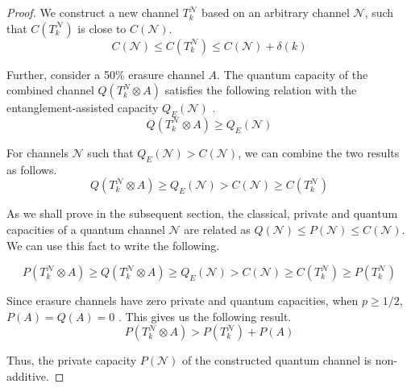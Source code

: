 \begin{proof}
We construct a new channel $T_k^\mathcal{N}$ based on an arbitrary channel $\mathcal{N}$, such that $C(T_k^\mathcal{N})$ is close to $C(\mathcal{N})$.
$$C(\mathcal{N}) \leq C(T_k^\mathcal{N}) \leq C(\mathcal{N}) + \delta(k)$$

Further, consider a 50\% erasure channel $A$. The quantum capacity of the combined channel $Q(T_k^N \otimes A)$ satisfies the following relation with the entanglement-assisted capacity $Q_E(\mathcal{N})$ \cite{PhysRevLett.83.3081}.
$$Q(T_k^\mathcal{N} \otimes A) \geq Q_E(\mathcal{N})$$

For channels $\mathcal{N}$ such that $Q_E(\mathcal{N}) > C(\mathcal{N})$, we can combine the two results as follows.
$$Q(T_k^\mathcal{N} \otimes A) \geq Q_E(\mathcal{N}) > C(\mathcal{N}) \geq C(T_k^\mathcal{N})$$

As we shall prove in the subsequent section, the classical, private and quantum capacities of a quantum channel $\mathcal{N}$ are related as $Q(\mathcal{N}) \leq P(\mathcal{N}) \leq C(\mathcal{N})$. We can use this fact to write the following.

$$P(T_k^\mathcal{N} \otimes A) \geq Q(T_k^\mathcal{N} \otimes A) \geq Q_E(\mathcal{N}) > C(\mathcal{N}) \geq C(T_k^\mathcal{N}) \geq P(T_k^\mathcal{N})$$

Since erasure channels have zero private and quantum capacities, when $p \geq 1/2$, $P(A) = Q(A) = 0$ \cite{PhysRevLett.78.3217}. This gives us the following result.
$$P(T_k^\mathcal{N} \otimes A) > P(T_k^\mathcal{N}) + P(A)$$

Thus, the private capacity $P(\mathcal{N})$ of the constructed quantum channel is non-additive.
\end{proof}
